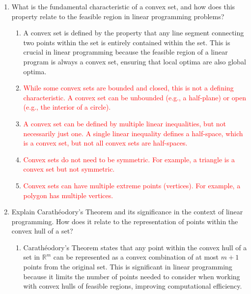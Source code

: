 \documentclass{article}%
\newcommand{\incorrect}[1]{\textcolor{red}{#1}}
\begin{document}
\begin{enumerate}
\begin{enumerate}
\item \incorrect{Similar to option C, the condition $x \le 0$ and $y \le 0$ would restrict the set to the third quadrant, but the resulting set would still be convex.}%
\item \incorrect{The convexity of the set is determined by its shape, not the specific values of $x$ and $y$. The set $S$ is convex regardless of the values of $x$ and $y$ within the unit circle.}%
\end{enumerate}%
\vspace{1em}%
\item What is the fundamental characteristic of a convex set, and how does this property relate to the feasible region in linear programming problems?%
\begin{enumerate}%
\item A convex set is defined by the property that any line segment connecting two points within the set is entirely contained within the set. This is crucial in linear programming because the feasible region of a linear program is always a convex set, ensuring that local optima are also global optima.%
\item \incorrect{While some convex sets are bounded and closed, this is not a defining characteristic.  A convex set can be unbounded (e.g., a half-plane) or open (e.g., the interior of a circle).}%
\item \incorrect{A convex set can be defined by multiple linear inequalities, but not necessarily just one.  A single linear inequality defines a half-space, which is a convex set, but not all convex sets are half-spaces.}%
\item \incorrect{Convex sets do not need to be symmetric.  For example, a triangle is a convex set but not symmetric.}%
\item \incorrect{Convex sets can have multiple extreme points (vertices).  For example, a polygon has multiple vertices.}%
\end{enumerate}%
\vspace{1em}%
\item Explain Carathéodory's Theorem and its significance in the context of linear programming.  How does it relate to the representation of points within the convex hull of a set?%
\begin{enumerate}%
\item Carathéodory's Theorem states that any point within the convex hull of a set in $\mathbb{R}^m$ can be represented as a convex combination of at most $m+1$ points from the original set. This is significant in linear programming because it limits the number of points needed to consider when working with convex hulls of feasible regions, improving computational efficiency.%

\end{enumerate}
\end{enumerate}
\end{document}
